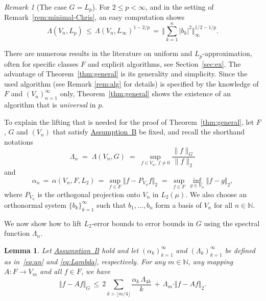 \documentclass[a4paper,12pt]{amsart}
\newtheorem{lemma}[theorem]{Lemma}
\theoremstyle{definition}
\theoremstyle{remark}
\newtheorem{remark}[theorem]{Remark}
\begin{document}
\begin{remark}[{The case $G=L_p$}]
{For} $2\le p < \infty$,
{and in the setting of Remark~\ref{rem:minimal-Chris},} an easy computation shows
\[
\Lambda(V_n,L_p) \,\le\, \Lambda(V_n,L_\infty)^{1-2/p}
 \,=\,
 \Big\Vert\sum_{k=1}^{n} \left| b_k \right|^2\Big\Vert_{\infty}^{1/2-1/p}.
\]
\end{remark}


There are 
numerous results in the literature 
on uniform and $L_p$-approximation, often for specific classes $F$ 
and explicit algorithms, see Section~\ref{sec:ex}. 
The advantage of Theorem~\ref{thm:general} 
is its generality and simplicity. 
{Since the used algorithm (see Remark \ref{rem:alg} for details) is specified 
by the knowledge of $F$ and $(V_n)_{n=1}^\infty$ only, 
Theorem~\ref{thm:general} shows the existence of 
an algorithm that is \emph{universal} in $p$.}



\bigskip


{To explain the lifting that is needed for the proof of Theorem~\ref{thm:general}, }
let $F$, $G$ and $(V_n)$ that satisfy 
\hyperlink{assum}
{Assumption~B} be fixed, and  
recall 
the shorthand notations 
\begin{equation*}%
\Lambda_n \;
{=}
\;\Lambda(V_n,G) \;
{=}
\; \sup\limits_{f \in V_n, \, f\neq 0} \frac{\|f\|_G}{\|f\|_2} 
\end{equation*}
and 
\begin{equation*}%
\alpha_n \,
{=}
\, \alpha(V_n,F, L_2) \,
{=}
\, \sup_{f \in F} \Vert f - P_{V_n} f  \Vert_2
\;=\; \sup_{f \in F}\, \inf_{g\in V_n}\Vert f - g  \Vert_2, 
\end{equation*}
where $P_{V_n}$ is the orthogonal projection onto $V_n$ in $L_2(\mu)$. 
We also choose an orthonormal system $\{b_k\}_{k=1}^\infty$
such that $b_1,\dots,b_n$
form a basis of $V_n$ for all $n\in\mathbb{N}$.

{
We now show how to lift $L_2$-error bounds
to error bounds in $G$ using the spectral function $\Lambda_n$.
}

\begin{lemma}\label{lem:lift}
 Let \hyperlink{assum}{Assumption~B} hold and let 
 $(\alpha_k)_{k=1}^\infty$ and $(\Lambda_k)_{k=1}^\infty$ be defined as in~\eqref{eq:an} and \eqref{eq:Lambda}, respectively.
 For any $m\in\mathbb{N}$, any mapping $A\colon F \to V_m$ and all $f\in F$,  we have
 \begin{equation*}%
  \Vert f - Af\Vert_{G}\,\le\, 
  2 \sum_{k > \lfloor m/4 \rfloor 
    } \frac{ \alpha_k \, \Lambda_{4k}}{k} 
  \,+\, \Lambda_m \cdot \Vert f-Af\Vert_2.
 \end{equation*}
 \end{lemma}
 
\end{document}
